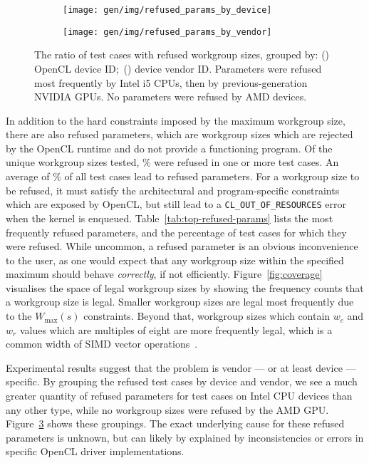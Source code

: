 \begin{figure}
\centering
\begin{subfigure}[h]{.45\textwidth}
  \centering
  \texttt{[image: gen/img/refused\_params\_by\_device]}
  \caption{}
  \label{fig:refused-params-by-device}
\end{subfigure}
\hfill
\begin{subfigure}[h]{.45\textwidth}
  \centering
  \texttt{[image: gen/img/refused\_params\_by\_vendor]}
  \caption{}
  \label{fig:refused-params-by-vendor}
\end{subfigure}
\caption{%
  The ratio of test cases with refused workgroup sizes, grouped by:
  () OpenCL device ID;\
  () device vendor ID. Parameters
  were refused most frequently by Intel i5 CPUs, then by
  previous-generation NVIDIA GPUs. No parameters were refused by AMD
  devices.%
}
\label{fig:refused-params-by-dev-vendor}
\end{figure}

In addition to the hard constraints imposed by the maximum workgroup
size, there are also refused parameters, which are workgroup sizes
which are rejected by the OpenCL runtime and do not provide a
functioning program. Of the  unique workgroup
sizes tested, \% were refused in one
or more test cases. An average of
\% of all test cases lead to
refused parameters. For a workgroup size to be refused, it must
satisfy the architectural and program-specific constraints which are
exposed by OpenCL, but still lead to a \texttt{CL\_OUT\_OF\_RESOURCES}
error when the kernel is enqueued. Table~\ref{tab:top-refused-params}
lists the most frequently refused parameters, and the percentage of
test cases for which they were refused. While uncommon, a refused
parameter is an obvious inconvenience to the user, as one would expect
that any workgroup size within the specified maximum should behave
\emph{correctly}, if not efficiently. Figure~\ref{fig:coverage}
visualises the space of legal workgroup sizes by showing the frequency
counts that a workgroup size is legal. Smaller workgroup sizes are
legal most frequently due to the $W_{\max}(s)$ constraints. Beyond
that, workgroup sizes which contain $w_c$ and $w_r$ values which are
multiples of eight are more frequently legal, which is a common width
of SIMD vector operations~\cite{IntelCorporation2012}.

Experimental results suggest that the problem is vendor --- or at
least device --- specific. By grouping the refused test cases by
device and vendor, we see a much greater quantity of refused
parameters for test cases on Intel CPU devices than any other type,
while no workgroup sizes were refused by the AMD
GPU. Figure~\ref{fig:refused-params-by-dev-vendor} shows these
groupings. The exact underlying cause for these refused parameters is
unknown, but can likely by explained by inconsistencies or errors in
specific OpenCL driver implementations.

